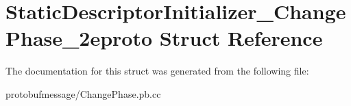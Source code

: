 \hypertarget{struct_static_descriptor_initializer___change_phase__2eproto}{\section{Static\-Descriptor\-Initializer\-\_\-\-Change\-Phase\-\_\-2eproto Struct Reference}
\label{struct_static_descriptor_initializer___change_phase__2eproto}
}


The documentation for this struct was generated from the following file\-:\begin{DoxyCompactItemize}
\item 
protobufmessage/Change\-Phase.\-pb.\-cc\end{DoxyCompactItemize}
